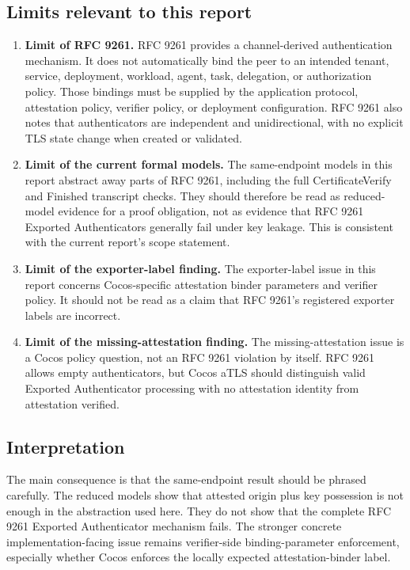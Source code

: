 \documentclass[11pt,a4paper]{article}
\begin{document}
\subsection{Limits relevant to this report}

\begin{enumerate}
\item \textbf{Limit of RFC 9261.}
RFC 9261 provides a channel-derived authentication mechanism. It does not
automatically bind the peer to an intended tenant, service, deployment,
workload, agent, task, delegation, or authorization policy. Those bindings
must be supplied by the application protocol, attestation policy, verifier
policy, or deployment configuration. RFC 9261 also notes that authenticators
are independent and unidirectional, with no explicit TLS state change when
created or validated.

\item \textbf{Limit of the current formal models.}
The same-endpoint models in this report abstract away parts of RFC 9261,
including the full CertificateVerify and Finished transcript checks. They
should therefore be read as reduced-model evidence for a proof obligation, not
as evidence that RFC 9261 Exported Authenticators generally fail under key
leakage. This is consistent with the current report's scope statement.

\item \textbf{Limit of the exporter-label finding.}
The exporter-label issue in this report concerns Cocos-specific attestation
binder parameters and verifier policy. It should not be read as a claim that
RFC 9261's registered exporter labels are incorrect.

\item \textbf{Limit of the missing-attestation finding.}
The missing-attestation issue is a Cocos policy question, not an RFC 9261
violation by itself. RFC 9261 allows empty authenticators, but Cocos aTLS
should distinguish valid Exported Authenticator processing with no attestation
identity from attestation verified.
\end{enumerate}

\subsection{Interpretation}

The main consequence is that the same-endpoint result should be phrased
carefully. The reduced models show that attested origin plus key possession is
not enough in the abstraction used here. They do not show that the complete
RFC 9261 Exported Authenticator mechanism fails. The stronger concrete
implementation-facing issue remains verifier-side binding-parameter
enforcement, especially whether Cocos enforces the locally expected
attestation-binder label.
\end{document}
